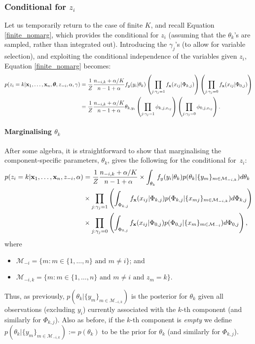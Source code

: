 \documentclass[12pt]{article}
\begin{document}
\subsubsection{Conditional for $z_i$ }

Let us temporarily return to the case of finite $K$, and recall Equation \eqref{finite_nomarg}, which provides the conditional for $z_i$ (assuming that the $\theta_k$'s are sampled, rather than integrated out).  Introducing the $\gamma_j$'s (to allow for variable selection), and exploiting the conditional independence of the variables given $z_i$, Equation \eqref{finite_nomarg} becomes: 
\begin{align}
p(z_i = k| {\bf x}_1,\ldots, {\bf x}_n,\boldsymbol{\theta}, z_{-i}, \alpha, \gamma) &= \frac{1}{Z} \frac{n_{-i,k} + \alpha/K}{n - 1 + \alpha}  f_{ y}({ y}_i | \theta_k)\left(\prod_{j: {\gamma_j} = 1}f_{\bf x}(x_{ij} | \Phi_{k,j})\right)\left(\prod_{j: {\gamma_j} = 0}f_{\bf x}(x_{ij} | \Phi_{0,j})\right)\\
&= \frac{1}{Z} \frac{n_{-i,k} + \alpha/K}{n - 1 + \alpha}  \theta_{k,y_i}\left(\prod_{j: {\gamma_j} = 1} \phi_{k,j,x_{ij}}\right)\left(\prod_{j: {\gamma_j} = 0}\phi_{0,j,x_{ij}}\right).
\label{finite_nomarg_fs}
\end{align} 

\paragraph{Marginalising $\theta_k$}
After some algebra, it is straightforward to show that marginalising the component-specific parameters, $\theta_k$, gives the following for the conditional for~$z_i$:
\begin{align}
p(z_i = k| {\bf x}_1,\ldots, {\bf x}_n,z_{-i}, \alpha) &= \frac{1}{Z} \frac{n_{-i,k} + \alpha/K}{n - 1 + \alpha} \times \int_{\theta_k}f_{y}(y_i | \theta_k) p(\theta_k|\{{ y}_{m}\}_{m\in \mathcal{M}_{-i,k}}) d\theta_k\notag\\
&\times \prod_{j: {\gamma_j} = 1} \left(\int_{\Phi_{k,j}}f_{{\bf x}}(x_{ij} | \Phi_{k,j}) p(\Phi_{k,j}|\{{ x}_{mj}\}_{m\in \mathcal{M}_{-i,k}}) d\Phi_{k,j}\right)\notag\\
&\times \prod_{j: {\gamma_j} = 0} \left(\int_{\Phi_{0,j}}f_{{\bf x}}(x_{ij} | \Phi_{0,j}) p(\Phi_{0,j}|\{{ x}_{m}\}_{m\in \mathcal{M}_{-i}}) d\Phi_{0,j}\right),\label{condci4_fs}
\end{align} 
where 
\begin{itemize}
\item $\mathcal{M}_{-i} = \{m : m \in \{1, \ldots, n \} \mbox{ and } m \ne i \}$; and 
\item $\mathcal{M}_{-i,k} = \{m : m \in \{1, \ldots, n \}\mbox{ and }  m \ne i\mbox{ and }  z_m = k \}$.  
\end{itemize}
Thus, as previously, $p(\theta_k|\{{ y}_{m}\}_{m\in \mathcal{M}_{-i,k}})$ is the posterior for $\theta_k$ given all observations (excluding $y_i$) currently associated with the $k$-th component (and similarly for $\Phi_{k,j}$).  Also as before, if the $k$-th component is {\em empty} we define $p(\theta_k|\{{ y}_{m}\}_{m\in \mathcal{M}_{-i,k}}) := p(\theta_k)$ to be the prior for $\theta_k$ (and similarly for $\Phi_{k,j}$).  
\end{document}
